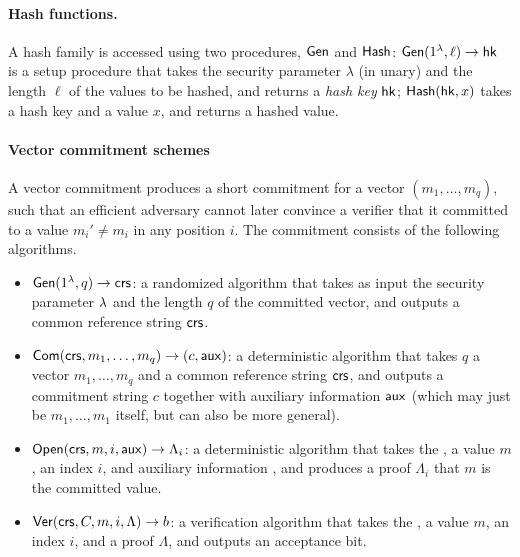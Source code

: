 \paragraph{Hash functions.}
A hash family is accessed using two procedures, $\mathsf{Gen}$ and $\mathsf{Hash}$:
$\mathsf{Gen}(1^\lambda, \ell)\rightarrow \mathsf{hk}$ is a setup procedure that takes the security parameter $\lambda$
(in unary) and the length $\ell$ of the values to be hashed, and returns a \emph{hash key} $\mathsf{hk}$;
$\mathsf{Hash}(\mathsf{hk}, x)$ takes a hash key and a value $x$, and returns a hashed value.

\paragraph{Vector commitment schemes}
A vector commitment produces a short commitment for a vector $(m_1,\ldots,m_q)$,
such that an efficient adversary cannot later convince a verifier that it committed to a value $m_i' \neq m_i$
in any position $i$.
The commitment
consists of the following algorithms.

\vspace{-1ex}
\begin{itemize}
    \item $\mathsf{Gen}(1^\lambda, q)\to \mathsf{crs}$: a randomized algorithm that takes as input the security parameter $\lambda$ and the length $q$ of the committed vector, and outputs a common reference string $\mathsf{crs}$.
    \item $\mathsf{Com}(\mathsf{crs}, m_1,\ldots , m_q)\to (c,\mathsf{aux})$: a deterministic algorithm that takes $q$ a vector $m_1,\ldots, m_q$ and a common reference string $\mathsf{crs}$, and outputs a commitment string $c$ together with auxiliary information $\mathsf{aux}$ (which may just be $m_1,\ldots,m_1$ itself, but can also be more general).
    \item $\mathsf{Open}(\mathsf{crs}, m, i, \mathsf{aux})\to \Lambda_i$: a deterministic algorithm that takes the \crs, a value $m$, an index $i$, and auxiliary information \aux, and produces a proof $\Lambda_i$ that $m$ is the \ith committed value.
    \item $\mathsf{Ver}(\mathsf{crs}, C, m, i, \Lambda)\to b$: a verification algorithm that takes the \crs, a value $m$, an index $i$, and a proof $\Lambda$, and outputs an acceptance bit.
\end{itemize}

